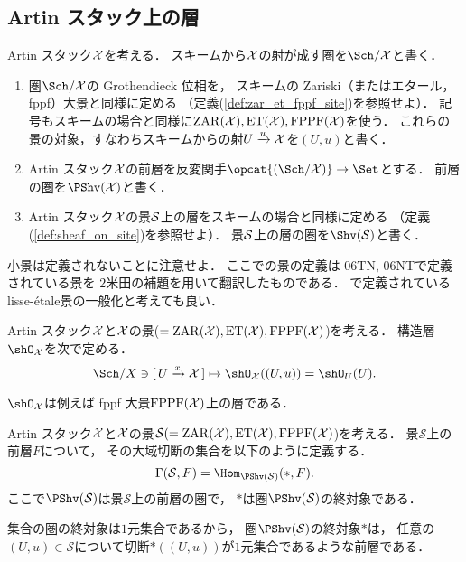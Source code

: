 \subsection{Artin スタック上の層}
    \begin{Def}
        Artin スタック$\mathcal{X}$を考える．
        スキームから$\mathcal{X}$の射が成す圏を$\Sch/\stX$と書く．
        \begin{enumerate}
        \item
            圏$\Sch/\stX$の Grothendieck 位相を，
            スキームの Zariski（またはエタール，fppf）大景と同様に定める
            （定義(\ref{def:zar_et_fppf_site})を参照せよ）．
            記号もスキームの場合と同様に$\mathrm{ZAR}(\mathcal{X}), \mathrm{ET}(\mathcal{X}), \mathrm{FPPF}(\mathcal{X})$を使う．
            これらの景の対象，すなわちスキームからの射$U \xrightarrow{u} \mathcal{X}$を$(U,u)$と書く．
        \item
            Artin スタック$\mathcal{X}$の前層を反変関手$\opcat{(\Sch/\stX)} \to \Set$とする．
            前層の圏を$\PShv(\stX)$と書く．
        \item
            Artin スタック$\mathcal{X}$の景$\mathcal{S}$上の層をスキームの場合と同様に定める
            （定義(\ref{def:sheaf_on_site})を参照せよ）．
            景$\mathcal{S}$上の層の圏を$\Shv(\siteS)$と書く．
        \end{enumerate}
    \end{Def}
    小景は定義されないことに注意せよ．
    ここでの景の定義は\cite{SP} 06TN, 06NTで定義されている景を
    $2$米田の補題を用いて翻訳したものである．
    \cite{LMB}で定義されているlisse-\'{e}tale景の一般化と考えても良い．

    \begin{Def}
        Artin スタック$\mathcal{X}$と$\mathcal{X}$の景($=\mathrm{ZAR}(\mathcal{X}), \mathrm{ET}(\mathcal{X}), \mathrm{FPPF}(\mathcal{X})$)を考える．
        構造層$\shO_{\stX}$を次で定める．
        \[ \Sch/X \ni [\, U \xto{x} \stX \,] \mapsto \shO_{\stX}((U,u))=\shO_{U}(U). \]
    \end{Def}
    $\shO_{\stX}$は例えば fppf 大景$\mathrm{FPPF}(\mathcal{X})$上の層である．

    \begin{Def}[\cite{SP} 06UN]
        Artin スタック$\mathcal{X}$と$\mathcal{X}$の景$\mathcal{S}(=\mathrm{ZAR}(\mathcal{X}), \mathrm{ET}(\mathcal{X}), \mathrm{FPPF}(\mathcal{X})$)を考える．
        景$\mathcal{S}$上の前層$F$について，
        その大域切断の集合を以下のように定義する．
        \[ \Gamma(\mathcal{S}, F)=\Hom_{\PShv(\mathcal{S})}(\ast, F). \]
        ここで$\PShv(\mathcal{S})$は景$\mathcal{S}$上の前層の圏で，
        $\ast$は圏$\PShv(\mathcal{S})$の終対象である．
    \end{Def}
    集合の圏の終対象は$1$元集合であるから，
    圏$\PShv(\mathcal{S})$の終対象$\ast$は，
    任意の$(U,u) \in \mathcal{S}$について切断$\ast((U,u))$が$1$元集合であるような前層である．

